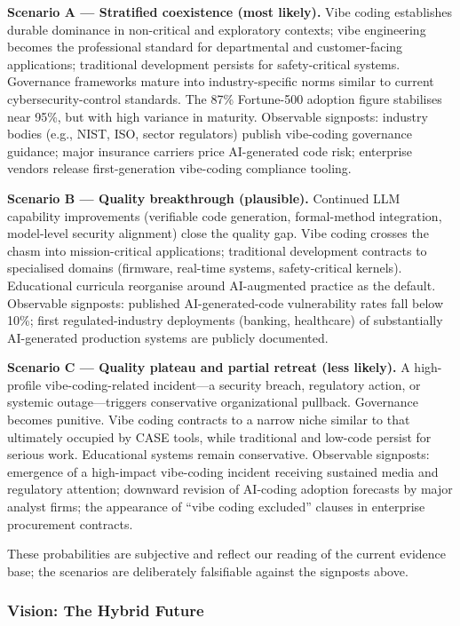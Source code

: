 \documentclass[preprint,12pt,authoryear]{elsarticle}
\begin{document}
\textbf{Scenario A --- Stratified coexistence (most likely).} Vibe coding establishes durable dominance in non-critical and exploratory contexts; vibe engineering becomes the professional standard for departmental and customer-facing applications; traditional development persists for safety-critical systems. Governance frameworks mature into industry-specific norms similar to current cybersecurity-control standards. The 87\% Fortune-500 adoption figure stabilises near 95\%, but with high variance in maturity. Observable signposts: industry bodies (e.g., NIST, ISO, sector regulators) publish vibe-coding governance guidance; major insurance carriers price AI-generated code risk; enterprise vendors release first-generation vibe-coding compliance tooling.

\textbf{Scenario B --- Quality breakthrough (plausible).} Continued LLM capability improvements (verifiable code generation, formal-method integration, model-level security alignment) close the quality gap. Vibe coding crosses the chasm into mission-critical applications; traditional development contracts to specialised domains (firmware, real-time systems, safety-critical kernels). Educational curricula reorganise around AI-augmented practice as the default. Observable signposts: published AI-generated-code vulnerability rates fall below 10\%; first regulated-industry deployments (banking, healthcare) of substantially AI-generated production systems are publicly documented.

\textbf{Scenario C --- Quality plateau and partial retreat (less likely).} A high-profile vibe-coding-related incident---a security breach, regulatory action, or systemic outage---triggers conservative organizational pullback. Governance becomes punitive. Vibe coding contracts to a narrow niche similar to that ultimately occupied by CASE tools, while traditional and low-code persist for serious work. Educational systems remain conservative. Observable signposts: emergence of a high-impact vibe-coding incident receiving sustained media and regulatory attention; downward revision of AI-coding adoption forecasts by major analyst firms; the appearance of ``vibe coding excluded'' clauses in enterprise procurement contracts.

These probabilities are subjective and reflect our reading of the current evidence base; the scenarios are deliberately falsifiable against the signposts above.

\subsubsection{Vision: The Hybrid Future}
\end{document}
